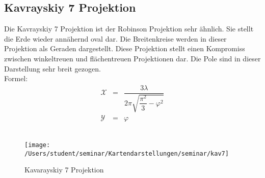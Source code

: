 \subsection{Kavrayskiy 7 Projektion}
\label{sec:kravrayskiy}
Die Kavrayskiy 7 Projektion ist der Robinson Projektion sehr ähnlich. Sie stellt die Erde wieder annähernd oval dar. Die Breitenkreise werden in dieser Projektion als Geraden dargestellt. Diese Projektion stellt einen Kompromiss zwischen winkeltreuen und flächentreuen Projektionen dar. Die Pole sind in dieser Darstellung sehr breit gezogen. \\
Formel:\\
\begin{eqnarray*}
\mathcal {X} & = & \dfrac {3\lambda } {2\pi \sqrt {\dfrac {\pi ^2}{3}-\varphi ^2}}\\
\mathcal {Y} & = &\varphi
\end{eqnarray*}\\

\begin{figure}[hbtp]
\centering
\texttt{[image: /Users/student/seminar/Kartendarstellungen/seminar/kav7]} \caption{Kavarayskiy 7 Projektion}
\end{figure}
\newpage 